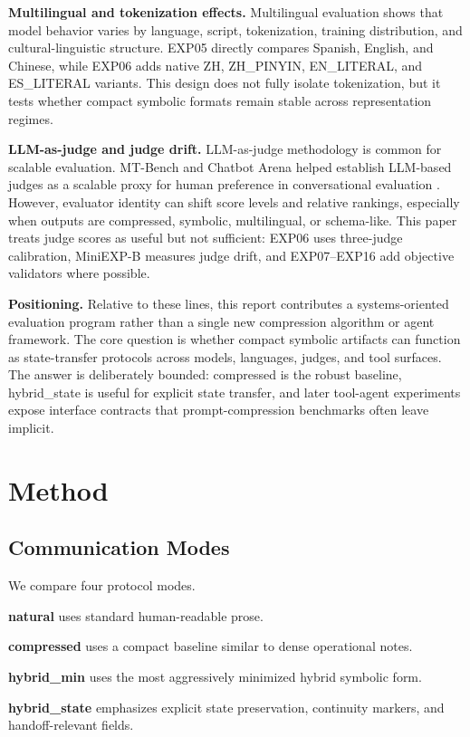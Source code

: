 \documentclass[11pt]{article}
\begin{document}
\textbf{Multilingual and tokenization effects.} Multilingual evaluation shows that model behavior varies by language, script, tokenization, training distribution, and cultural-linguistic structure. EXP05 directly compares Spanish, English, and Chinese, while EXP06 adds native ZH, ZH\_PINYIN, EN\_LITERAL, and ES\_LITERAL variants. This design does not fully isolate tokenization, but it tests whether compact symbolic formats remain stable across representation regimes.

\textbf{LLM-as-judge and judge drift.} LLM-as-judge methodology is common for scalable evaluation. MT-Bench and Chatbot Arena helped establish LLM-based judges as a scalable proxy for human preference in conversational evaluation \cite{zheng2023judging}. However, evaluator identity can shift score levels and relative rankings, especially when outputs are compressed, symbolic, multilingual, or schema-like. This paper treats judge scores as useful but not sufficient: EXP06 uses three-judge calibration, MiniEXP-B measures judge drift, and EXP07--EXP16 add objective validators where possible.

\textbf{Positioning.} Relative to these lines, this report contributes a systems-oriented evaluation program rather than a single new compression algorithm or agent framework. The core question is whether compact symbolic artifacts can function as state-transfer protocols across models, languages, judges, and tool surfaces. The answer is deliberately bounded: compressed is the robust baseline, hybrid\_state is useful for explicit state transfer, and later tool-agent experiments expose interface contracts that prompt-compression benchmarks often leave implicit.

\section{Method}
\subsection{Communication Modes}
We compare four protocol modes.

\textbf{natural} uses standard human-readable prose.

\textbf{compressed} uses a compact baseline similar to dense operational notes.

\textbf{hybrid\_min} uses the most aggressively minimized hybrid symbolic form.

\textbf{hybrid\_state} emphasizes explicit state preservation, continuity markers, and handoff-relevant fields.
\end{document}
